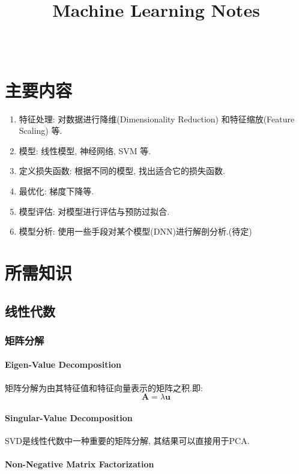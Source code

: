 \documentclass[oneside]{book}
\title{\titlteFont Machine Learning Notes}
\author{\authorFont{Jiang Tao}\\ \NovaMonoFont{vix2018@gmail.com}}
\date{\NovaMonoFont 2019}
\begin{document}
	\begin{titlepage}
		\maketitle
	\end{titlepage}
	\tableofcontents
	\setcounter{chapter}{0}
	\renewcommand{\thechapter}{\roman{chapter}}
	\chapter{主要内容}
			\begin{enumerate} 
				\item 特征处理: 对数据进行降维(Dimensionality Reduction) 和特征缩放(Feature Scaling) 等.
				\item 模型: 线性模型, 神经网络, SVM 等.
				\item 定义损失函数: 根据不同的模型, 找出适合它的损失函数.
				\item 最优化: 梯度下降等.
				\item 模型评估: 对模型进行评估与预防过拟合.
				\item 模型分析: 使用一些手段对某个模型(DNN)进行解剖分析.(待定)
			\end{enumerate}
	\chapter{所需知识}
		\section{线性代数}
			\subsection{矩阵分解}
				\subsubsection{Eigen-Value Decomposition}
					矩阵分解为由其特征值和特征向量表示的矩阵之积.即:
					$$\boldsymbol{A} = \lambda \boldsymbol{u}$$
				\subsubsection{Singular-Value Decomposition}
					SVD是线性代数中一种重要的矩阵分解, 其结果可以直接用于PCA.	
				\subsubsection{Non-Negative Matrix Factorization}	
\end{document}
